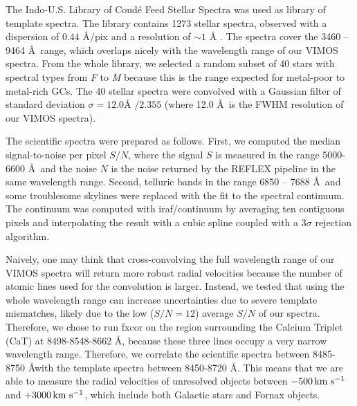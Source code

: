 \documentclass[useAMS,usenatbib]{mn2e}
\newcommand{\kms}{\mbox{\,km~s$^{-1}$}}
\begin{document}
The Indo-U.S. Library of Coud\'e Feed Stellar Spectra \citep{Valdes04} was used 
as library of template spectra. The library contains 1273 stellar spectra, 
observed with a dispersion of $0.44$ \AA /pix and a resolution of $\sim 1$ \AA 
. The spectra cover the 3460 -- 9464 \AA\ range, which overlaps nicely with the 
wavelength range of our VIMOS spectra. From the whole library, we selected a 
random subset of 40 stars with spectral types from \textit{F} to \textit{M} 
because this is the range expected for metal-poor to metal-rich GCs. The 40 
stellar spectra were convolved with a Gaussian filter of standard deviation 
$\sigma = 12.0\mbox{\AA\ } / 2.355$ (where 12.0 \AA\ is the FWHM resolution of 
our VIMOS spectra). 

The scientific spectra were prepared as follows. First, we computed the median 
signal-to-noise per pixel $S/N$, where the signal $S$ is measured in the range 
5000-6600 \AA\ and the noise $N$ is the noise returned by the REFLEX pipeline 
in the same wavelength range. Second, telluric bands in the range 6850 -- 7688 
\AA\ and some troublesome skylines were replaced with the fit to the spectral 
continuum. The continuum was computed with iraf/continuum by averaging ten 
contiguous pixels and interpolating the result with a cubic spline coupled with 
a $3\sigma$ rejection algorithm.  

Naively, one may think that cross-convolving the full wavelength range of our 
VIMOS spectra will return more robust radial velocities because the number of 
atomic lines used for the convolution is larger. Instead, we tested that using 
the whole wavelength range can increase uncertainties due to severe template 
mismatches, likely due to the low ($S/N = 12$) average $S/N$ of our spectra. 
Therefore, we chose to run fxcor on the region surrounding the Calcium Triplet 
(CaT) at 8498-8548-8662 \AA , because these three lines occupy a very narrow 
wavelength range. Therefore, we correlate the scientific spectra between 
8485-8750 \AA with the template spectra between 8450-8720 \AA . This means that 
we are able to measure the radial velocities of unresolved objects between 
$-500 \kms$ and $+3000\kms$, which include both Galactic stars and Fornax 
objects.   
\end{document}
